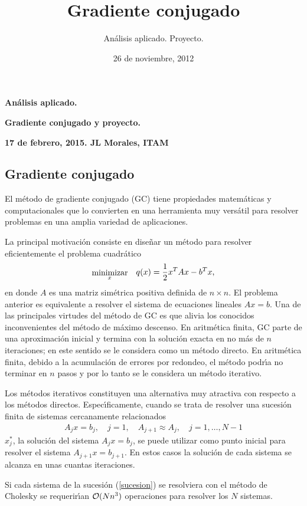 \documentclass[12pt]{article}
\newcommand{\bea}{\begin{eqnarray}}
\newcommand{\eea}{\end{eqnarray}}
\begin{document}
\title{Gradiente conjugado}
\author{An\'alisis aplicado. Proyecto.}
\date{26 de noviembre, 2012}

\centerline{\large \bf An\'alisis aplicado.}
\centerline{\large \bf Gradiente conjugado y proyecto.}
\centerline{\bf 17 de febrero, 2015. JL Morales, ITAM}

\subsection*{Gradiente conjugado}
El m\'etodo de gradiente conjugado (GC) tiene propiedades matem\'aticas y computacionales que lo convierten en una herramienta muy vers\'atil para resolver problemas  en una amplia variedad de aplicaciones. 

La principal motivaci\'on consiste en dise\~nar un m\'etodo para resolver eficientemente el problema cuadr\'atico
\bea  \label{opt}
  \stackrel{\mbox{minimizar}}{ {}_x } & & \raisebox{1.0ex}{$\displaystyle q(x) = \frac{1}{2} x^TAx -b^Tx$,}
\eea
en donde $A$ es una matriz sim\'etrica positiva definida de $n \times n$. El problema anterior es equivalente a resolver el  sistema de ecuaciones lineales $Ax = b$. Una de las principales virtudes del m\'etodo de GC es que alivia los conocidos inconvenientes del m\'etodo de m\'aximo descenso. En aritm\'etica finita,  GC parte de una aproximaci\'on inicial y termina con la soluci\'on exacta en no m\'as de $n$ iteraciones; en este sentido se le considera como un m\'etodo directo. En  aritm\'etica finita, debido a la acumulaci\'on de errores por redondeo, el m\'etodo podr\'{\i}a no terminar en $n$ pasos y por lo tanto se le considera un m\'etodo iterativo.

 Los m\'etodos iterativos constituyen una alternativa muy atractiva con respecto a los m\'etodos directos. Espec\'{\i}ficamente, cuando se trata de resolver una sucesi\'on finita de sistemas cercanamente relacionados 
\bea
   A_j x = b_j, \quad j=1, \quad A_{j+1} \approx A_j, \quad j=1,\ldots, N-1 \label{sucesion}
\eea
 $x_j^*$, la soluci\'on del sistema $A_j x = b_j$, se puede utilizar como punto inicial para resolver el sistema
$A_{j+1} x = b_{j+1}$. En estos casos la  soluci\'on de cada sistema se alcanza en unas cuantas iteraciones.

Si cada sistema de la  sucesi\'on (\ref{sucesion}) se resolviera con el m\'etodo de Cholesky se requerir\'{\i}an  ${\cal O}(Nn^3)$ operaciones para resolver los $N$ sistemas.
\end{document}
